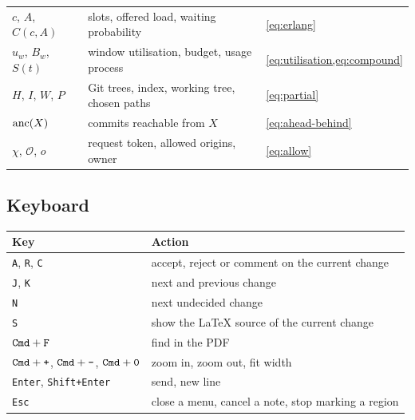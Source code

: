 \begin{center}
\begin{tabular}{@{}lll@{}}
$c$, $A$, $C(c, A)$ & slots, offered load, waiting probability & \cref{eq:erlang} \\
$u_w$, $B_w$, $S(t)$ & window utilisation, budget, usage process & \cref{eq:utilisation,eq:compound} \\
$H$, $I$, $W$, $P$ & Git trees, index, working tree, chosen paths & \cref{eq:partial} \\
$\operatorname{anc}(X)$ & commits reachable from $X$ & \cref{eq:ahead-behind} \\
$\chi$, $\mathcal{O}$, $o$ & request token, allowed origins, owner & \cref{eq:allow} \\
\bottomrule
\end{tabular}
\end{center}

\subsection{Keyboard}

\begin{center}
\small
\begin{tabular}{@{}ll@{}}
\toprule
Key & Action \\
\midrule
\texttt{A}, \texttt{R}, \texttt{C} & accept, reject or comment on the current change \\
\texttt{J}, \texttt{K} & next and previous change \\
\texttt{N} & next undecided change \\
\texttt{S} & show the \LaTeX{} source of the current change \\
$\text{\texttt{Cmd}} + \text{\texttt{F}}$ & find in the PDF \\
$\text{\texttt{Cmd}} + \text{\texttt{+}}$, $\text{\texttt{Cmd}} + \text{\texttt{-}}$, $\text{\texttt{Cmd}} + \text{\texttt{0}}$ & zoom in, zoom out, fit width \\
\texttt{Enter}, \texttt{Shift+Enter} & send, new line \\
\texttt{Esc} & close a menu, cancel a note, stop marking a region \\
\bottomrule
\end{tabular}
\end{center}

